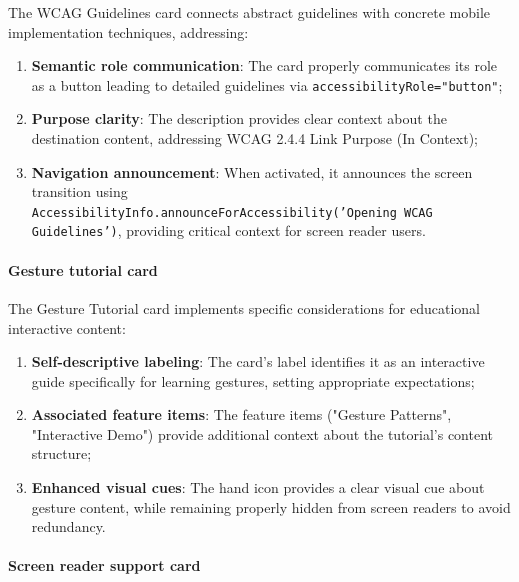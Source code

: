 The WCAG Guidelines card connects abstract guidelines with concrete mobile implementation techniques, addressing:

\begin{enumerate}
    \item \textbf{Semantic role communication}: The card properly communicates its role as a button leading to detailed guidelines via \texttt{accessibilityRole="button"};
    
    \item \textbf{Purpose clarity}: The description provides clear context about the destination content, addressing WCAG 2.4.4 Link Purpose (In Context);
    
    \item \textbf{Navigation announcement}: When activated, it announces the screen transition using \\ \texttt{AccessibilityInfo.announceForAccessibility('Opening WCAG Guidelines')}, providing critical context for screen reader users.
\end{enumerate}

\paragraph{Gesture tutorial card}

The Gesture Tutorial card implements specific considerations for educational interactive content:

\begin{enumerate}
    \item \textbf{Self-descriptive labeling}: The card's label identifies it as an interactive guide specifically for learning gestures, setting appropriate expectations;
    
    \item \textbf{Associated feature items}: The feature items ("Gesture Patterns", "Interactive Demo") provide additional context about the tutorial's content structure;
    
    \item \textbf{Enhanced visual cues}: The hand icon provides a clear visual cue about gesture content, while remaining properly hidden from screen readers to avoid redundancy.
\end{enumerate}

\paragraph{Screen reader support card}


